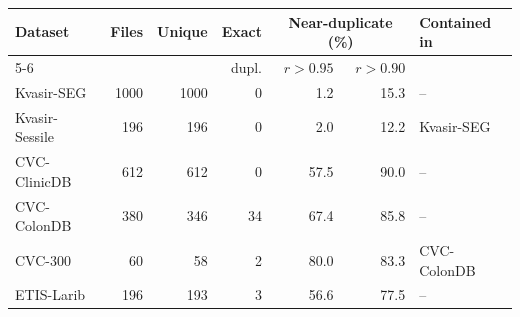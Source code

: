 \begin{tabular}{lrrrrrl}
\toprule
Dataset & Files & Unique & Exact & \multicolumn{2}{c}{Near-duplicate (\%)} & Contained in \\
\cmidrule(lr){5-6}
 & & & dupl. & $r>0.95$ & $r>0.90$ & \\
\midrule
Kvasir-SEG & 1000 & 1000 & 0 & 1.2 & 15.3 & -- \\
Kvasir-Sessile & 196 & 196 & 0 & 2.0 & 12.2 & Kvasir-SEG \\
CVC-ClinicDB & 612 & 612 & 0 & 57.5 & 90.0 & -- \\
CVC-ColonDB & 380 & 346 & 34 & 67.4 & 85.8 & -- \\
CVC-300 & 60 & 58 & 2 & 80.0 & 83.3 & CVC-ColonDB \\
ETIS-Larib & 196 & 193 & 3 & 56.6 & 77.5 & -- \\
\bottomrule
\end{tabular}
